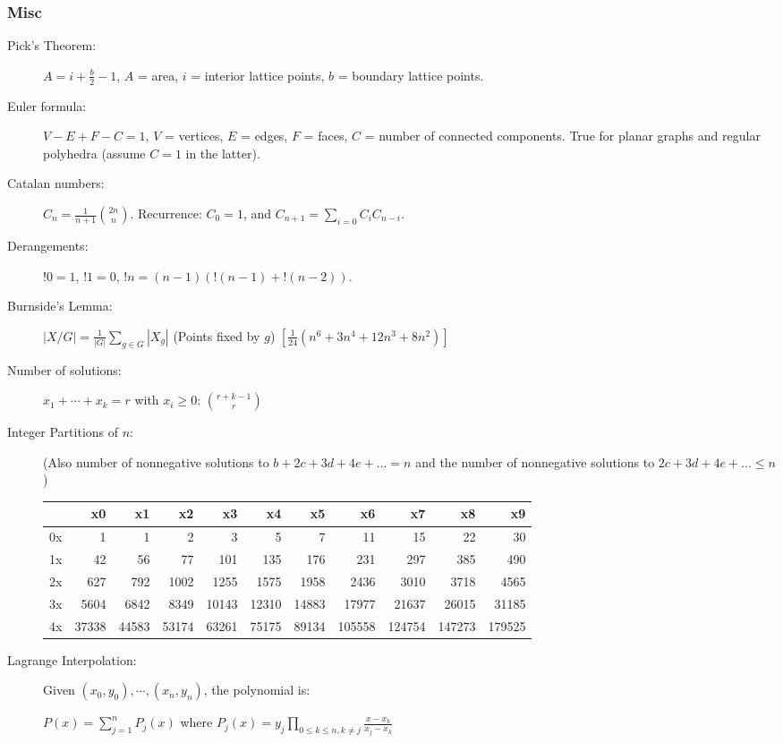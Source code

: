 \documentclass[landscape,10pt]{article}
\begin{document}
\begin{multicols*}{2}
\subsubsection*{Misc}

\begin{description}
\item[Pick's Theorem:] $A = i + \frac{b}{2} - 1$, $A$ = area, $i$ = interior
  lattice points, $b$ = boundary lattice points.
\item[Euler formula:] $V - E + F - C = 1$, $V$ = vertices, $E$ =
  edges, $F$ = faces, $C$ = number of connected components.  True for
  planar graphs and regular polyhedra (assume $C = 1$ in the latter).
\item[Catalan numbers:] $C_n = \frac{1}{n+1} \binom{2n}{n}$.
  Recurrence: $C_0 = 1$, and $C_{n+1} = \sum_{i=0} C_i C_{n-i}$.
\item[Derangements:] $!0 = 1$, $!1 = 0$, $!n = (n-1)(!(n-1) + !(n-2))$.
\item[Burnside's Lemma:] $|X/G| = \frac{1}{|G|}\sum_{g\in G} |X_g|$ (Points fixed by $g$) $[\frac{1}{24}(n^6+3n^4+12n^3+8n^2)]$
\item[Number of solutions:] $x_1 + \cdots + x_k = r$ with $x_i \geq 0$:
  $\binom{r+k-1}{r}$
\item[Integer Partitions of $n$:] (Also number of nonnegative solutions to $b+2c+3d+4e+...=n$ and the number of nonnegative solutions to $2c+3d+4e+...\leq n$)\\

\hskip-20pt
{\footnotesize
\begin{tabular}{|r|rrrrrrrrrr|}
\hline
   & x0 & x1 & x2 & x3 & x4 & x5 & x6 & x7 & x8 & x9 \\ \hline
0x & 1 & 1& 2& 3& 5& 7& 11& 15& 22& 30 \\
1x & 42& 56& 77& 101& 135& 176& 231& 297& 385& 490 \\
2x & 627& 792& 1002& 1255& 1575& 1958& 2436& 3010& 3718& 4565 \\
3x & 5604& 6842& 8349& 10143& 12310& 14883& 17977& 21637& 26015& 31185 \\
4x & 37338& 44583& 53174& 63261& 75175& 89134& 105558& 124754& 147273& 179525 \\\hline
\end{tabular}
}

\item[Lagrange Interpolation:] Given $(x_0,y_0), \cdots , (x_n,y_n)$, the polynomial is:

$P(x) = \displaystyle\sum_{j=1}^{n}P_j(x)$ where $P_j(x) = y_j\displaystyle\prod_{0 \leq k \leq n, k \neq j}\frac{x-x_k}{x_j-x_k}$


\end{description}
\end{multicols*}
\end{document}
